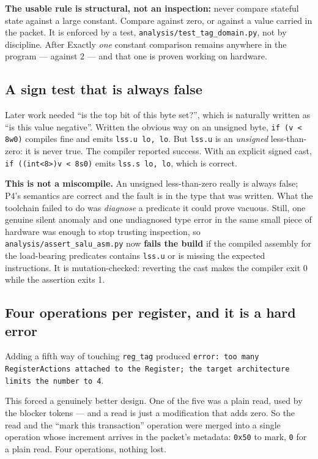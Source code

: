 \documentclass[10pt,a4paper,oneside]{article}
\newenvironment{keybox}{\begin{snugshade}\noindent\ignorespaces}{\end{snugshade}}
\newcommand{\code}[1]{\texttt{\small #1}}
\begin{document}
\begin{keybox}
\textbf{The usable rule is structural, not an inspection:} never compare stateful state
against a large constant. Compare against zero, or against a value carried in the packet.
It is enforced by a test,
\code{analysis/test\_tag\_domain.py}, not by discipline. After
Exactly \emph{one} constant comparison remains anywhere in the program ---
against 2 --- and that one is proven working on hardware.
\end{keybox}

\subsection{A sign test that is always false}

Later work needed ``is the top bit of this byte set?'', which is naturally written as ``is
this value negative''. Written the obvious way on an unsigned byte,
\code{if (v < 8w0)} compiles fine and emits \code{lss.u lo, lo}. But \code{lss.u} is an
\emph{unsigned} less-than-zero: it is never true. The compiler reported success. With an
explicit signed cast, \code{if ((int<8>)v < 8s0)} emits \code{lss.s lo, lo}, which is
correct.

\textbf{This is not a miscompile.} An unsigned less-than-zero really is always
false; P4's semantics are correct and the fault is in the type that was written. What the
toolchain failed to do was \emph{diagnose} a predicate it could prove vacuous. Still, one
genuine silent anomaly and one undiagnosed type error in the same small piece of hardware
was enough to stop trusting inspection, so \code{analysis/assert\_salu\_asm.py} now
\textbf{fails the build} if the
compiled assembly for the load-bearing predicates contains \code{lss.u} or is missing the
expected instructions. It is mutation-checked: reverting the cast makes the compiler exit 0
while the assertion exits 1.

\subsection{Four operations per register, and it is a hard error}

Adding a fifth way of touching \code{reg\_tag} produced
\code{error: too many RegisterActions attached to the Register; the target architecture
limits the number to 4}.

This forced a genuinely better design. One of the five was a plain read, used by the
blocker tokens --- and a read is just a modification that adds zero. So the read and the
``mark this transaction'' operation were merged into a single operation whose increment
arrives in the packet's metadata: \code{0x50} to mark, \code{0} for a plain read. Four
operations, nothing lost.
\end{document}

